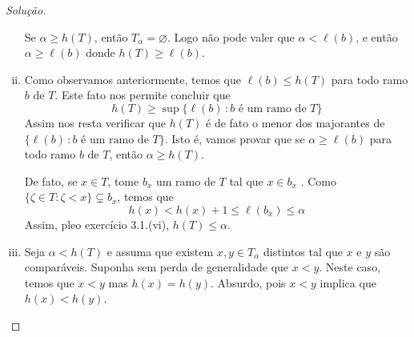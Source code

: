 \documentclass[a4paper]{article}
\begin{document}
\begin{proof}[Solução]
\begin{enumerate}[(i)]
Se \(\alpha\geq h(T)\), então \(T_\alpha=\varnothing\). Logo não pode valer que
\(\alpha<\ell(b)\), e então \(\alpha\geq\ell(b)\) donde \(h(T)\geq\ell(b)\).


        
      \item Como observamos anteriormente, temos que  \(\ell (b)\leq h(T)\) para
        todo ramo \(b\) de \(T\). Este fato nos permite concluir que
        \[h(T)\geq\sup\{\ell(b)\,\colon b \text{ é um ramo de } T\}\]
        Assim nos resta verificar que \(h(T)\) é de fato o menor dos majorantes
         de \(\{\ell(b)\,\colon b \text{ é um ramo de } T\}\). Isto é, vamos
         provar que se \(\alpha\geq  \ell (b)\)
        para todo ramo \(b\) de \(T\), então \(\alpha\geq h(T)\).
        
        De fato, se \(x\in T\), tome \(b_x\) um ramo de \(T\) tal que \(x\in b_x\) . Como \(\{\zeta\in T:\zeta<x\}\subsetneq b_x\), temos que \[h(x)<h(x)+1\leq
        \ell(b_x)\leq\alpha\]
        Assim, pleo exercício 3.1.(vi), \(h(T)\leq\alpha\).
        

      \item Seja \(\alpha < h(T)\) e assuma que existem \(x,y\in T_\alpha\)
          distintos tal que \(x\) e \(y\) são comparáveis.
          Suponha sem perda de generalidade que
          \(x<y\). Neste caso, temos que \(x<y\) mas \(h(x)=h(y)\). Absurdo, pois
          \(x<y\) implica que \(h(x) < h(y)\).\qedhere

    \end{enumerate}
  \end{proof}
\end{document}
